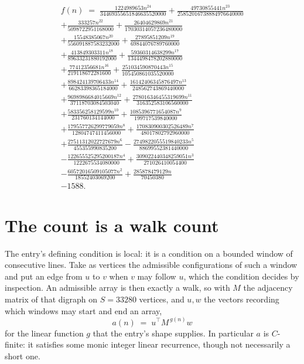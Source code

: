 \documentclass[11pt,a4paper]{article}
\theoremstyle{plain}
\theoremstyle{definition}
\begin{document}
\begin{multline*}
f(n)\;=\;\frac{1224989653 n^{24}}{34469355651846635520000} + \frac{49730855441 n^{23}}{25852016738884976640000} \\
+ \frac{333257 n^{22}}{5098722951168000} + \frac{26404629869 n^{21}}{17030314057236480000} \\
+ \frac{15548385067 n^{20}}{556091887583232000} + \frac{27895851209 n^{19}}{69844076789760000} \\
+ \frac{413849303311 n^{18}}{89633231880192000} + \frac{59360314638299 n^{17}}{1344498478202880000} \\
+ \frac{77412356681 n^{16}}{219118672281600} + \frac{251034590870443 n^{15}}{105450861035520000} \\
+ \frac{898424139706433 n^{14}}{66283398365184000} + \frac{16142406345876497 n^{13}}{248562743869440000} \\
+ \frac{9698986684015669 n^{12}}{37118703084503040} + \frac{278016346455319699 n^{11}}{316352583106560000} \\
+ \frac{583356258129599 n^{10}}{231760134144000} + \frac{1085396771654087 n^{9}}{199717539840000} \\
+ \frac{179557726299779059 n^{8}}{12804747411456000} + \frac{170830900302526489 n^{7}}{48017802792960000} \\
+ \frac{27511312022727679 n^{6}}{455355990835200} - \frac{2749822055519840233 n^{5}}{88699552381440000} \\
- \frac{122655525295200187 n^{4}}{1222675534080000} + \frac{309022440348259051 n^{3}}{271026410054400} \\
- \frac{60572016509105077 n^{2}}{18552403069200} + \frac{285878479129 n}{70450380} \\
- 1588.
\end{multline*}

\section{The count is a walk count}

The entry's defining condition is local: it is a condition on a bounded window of consecutive lines. Take as vertices the
admissible configurations of such a window and put an edge from $u$ to $v$ when $v$ may
follow $u$, which the condition decides by inspection. An admissible array is then exactly a
walk, so with $M$ the adjacency matrix of that digraph on $S=33280$ vertices, and $u,w$ the
vectors recording which windows may start and end an array,
\[
a(n)\;=\;u^{\!\top}M^{\,g(n)}w
\]
for the linear function $g$ that the entry's shape supplies. In particular $a$ is
$C$-finite: it satisfies some monic integer linear recurrence, though not necessarily a short
one.
\end{document}
